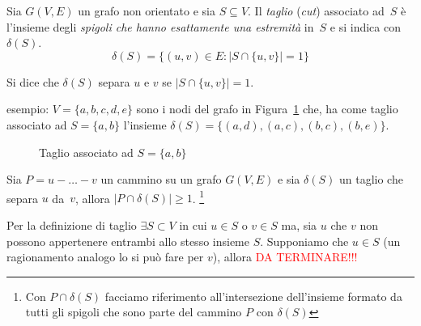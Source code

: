 \begin{defn}[taglio]
Sia ${G(V,E)}$ un grafo non orientato e sia ${S \subseteq V}$. Il \emph{taglio} (\emph{cut})
associato ad~$S$ è l'insieme degli \emph{spigoli che hanno esattamente una estremità} 
in~$S$ e si indica con~$\delta(S)$.
\[ \delta(S) = \{(u,v) \in E \colon | S \cap \{u,v\} | = 1 \} \]
\end{defn}
Si dice che $\delta(S)$ separa $u$ e $v$ se ${|S \cap \{u,v\}| = 1}$.

\begin{ese}
esempio: ${V=\{a,b,c,d,e\}}$ sono i nodi del grafo in Figura~\ref{fig:es_taglio} che, ha come
taglio associato ad ${S = \{a, b\}}$ l'insieme ${\delta(S)= \{(a,d),(a,c),(b,c),(b,e)\}}$.
    \begin{figure}[H]
        \centering
        \caption{Taglio associato ad $S = \{ a, b \}$} 
        \label{fig:es_taglio}
    \end{figure}
\end{ese}

\begin{thm}
Sia ${P = u - \dots - v}$ un cammino su un grafo ${G(V,E)}$ e sia $\delta(S)$ un taglio che
separa $u$ da~$v$, allora ${ |P \cap \delta(S)| \geqslant 1 }$. \footnote{Con
${P \cap \delta(S)}$ facciamo riferimento all'intersezione dell'insieme formato da
tutti gli spigoli che sono parte del cammino $P$ con $\delta(S)$}
\label{thm:taglio_cammino}
\end{thm}
\proof
Per la definizione di taglio ${\exists S \subset V}$ in cui ${u \in S}$ o ${v \in S}$ ma,
sia $u$ che $v$ non possono appertenere entrambi allo stesso insieme $S$. Supponiamo che
${u \in S}$ (un ragionamento analogo lo si può fare per $v$), allora 
\textcolor{red}{DA TERMINARE!!!}
\endproof

